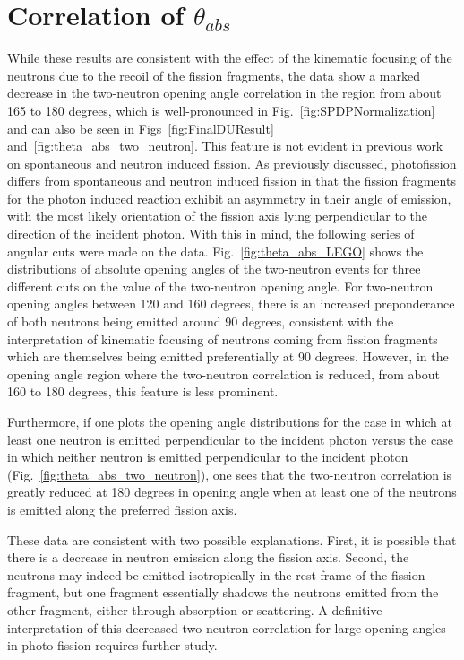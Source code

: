 \section{Correlation of $\theta_{abs}$}
While these results are consistent with the effect of the kinematic focusing of the neutrons due to the recoil of the fission fragments, the data show a marked decrease in the two-neutron opening angle correlation in the region from about 165 to 180 degrees, which is well-pronounced in Fig.~\ref{fig:SPDPNormalization} and can also be seen in Figs~\ref{fig:FinalDUResult} and~\ref{fig:theta_abs_two_neutron}.
This feature is not evident in previous work on spontaneous and neutron induced fission.
As previously discussed, photofission differs from spontaneous and neutron induced fission in that the fission fragments for the photon induced reaction exhibit an asymmetry in their angle of emission, with the most likely orientation of the fission axis lying perpendicular to the direction of the incident photon.
With this in mind, the following series of angular cuts were made on the data.
Fig.~\ref{fig:theta_abs_LEGO} shows the distributions of absolute opening angles of the two-neutron events for three different cuts on the value of the two-neutron opening angle.
For two-neutron opening angles between 120 and 160 degrees, there is an increased preponderance of both neutrons being emitted around 90 degrees, consistent with the interpretation of kinematic focusing of neutrons coming from fission fragments which are themselves being emitted preferentially at 90 degrees.
However, in the opening angle region where the two-neutron correlation is reduced, from about 160 to 180 degrees, this feature is less prominent.

Furthermore, if one plots the opening angle distributions for the case in which at least one neutron is emitted perpendicular to the incident photon versus the case in which neither neutron is emitted perpendicular to the incident photon (Fig.~\ref{fig:theta_abs_two_neutron}), one sees that the two-neutron correlation is greatly reduced at 180 degrees in opening angle when at least one of the neutrons is emitted along the preferred fission axis.

These data are consistent with two possible explanations.
First, it is possible that there is a decrease in neutron emission along the fission axis.
Second, the neutrons may indeed be emitted isotropically in the rest frame of the fission fragment, but one fragment essentially shadows the neutrons emitted from the other fragment, either through absorption or scattering.
A definitive interpretation of this decreased two-neutron correlation for large opening angles in photo-fission requires further study.

